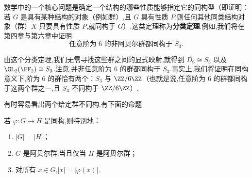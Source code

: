 


数学中的一个核心问题是确定一个结构的哪些性质能够指定它的同构型（即证明：若 $G$ 是具有某种结构的对象（例如群）,且 $G$ 具有性质 $P$,则任何其他同类结构对象（群）$X$ 只要具有性质 $P$,就同构于 $G$）.这类定理称为\textbf{分类定理}.例如,我们将在第四章与第六章中证明
\[
\text{任意阶为 }6\text{ 的非阿贝尔群都同构于 }S_3.
\]

由这个分类定理,我们无需寻找这些群之间的显式映射,就得到 $D_6\cong S_3$ 以及 $\GL_2(\FF_2)\cong S_3$.注意,并非任意阶为 $6$ 的群都同构于 $S_3$.事实上,我们将证明在同构意义下,阶为 $6$ 的群恰有两个：$S_3$ 与 $\ZZ/6\ZZ$（也就是说,任意阶为 $6$ 的群都同构于这两个群之一,且 $S_3$ 不同构于 $\ZZ/6\ZZ$）.

有时容易看出两个给定群不同构.有下面的命题
\begin{proposition}
	若 $\varphi:G\to H$ 是同构,则特别地：
\begin{enumerate}[label=(\alph*)]
	\item $|G|=|H|$；
	\item $G$ 是阿贝尔群,当且仅当 $H$ 是阿贝尔群；
	\item 对所有 $x\in G$,$|x|=|\varphi(x)|$.
\end{enumerate}
\end{proposition}
